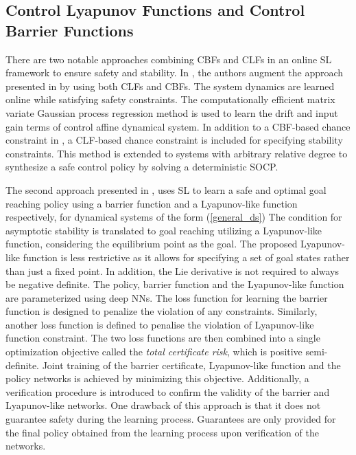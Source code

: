 \documentclass[3p,times,procedia]{elsarticle}
\begin{document}
\subsection{Control Lyapunov Functions and Control Barrier Functions}\label{sec:online-clf-cbf}
There are two notable approaches combining CBFs and CLFs in an online SL framework to ensure safety and stability. In \cite{Dhiman2020}, the authors augment the approach presented in \cite{Khojasteh2019} by using both CLFs and CBFs. The system dynamics are learned online while satisfying safety constraints. The computationally efficient matrix variate Gaussian process regression method is used to learn the drift and input gain terms of control affine dynamical system. In addition to a CBF-based chance constraint in \cite{Khojasteh2019}, a CLF-based chance constraint is included for specifying stability constraints. This method is extended to systems with arbitrary relative degree to synthesize a safe control policy by solving a deterministic SOCP.

The second approach presented in \cite{Jin2020}, uses SL to learn a safe and optimal goal reaching policy using a barrier function and a Lyapunov-like function respectively, for dynamical systems of the form (\ref{general_ds}) The condition for asymptotic stability is translated to goal reaching utilizing a Lyapunov-like function, considering the equilibrium point as the goal. The proposed Lyapunov-like function is less restrictive as it allows for specifying a set of goal states rather than just a fixed point. In addition, the Lie derivative is not required to always be negative definite. The policy, barrier function and the Lyapunov-like function are parameterized using deep NNs. The loss function for learning the barrier function is designed to penalize the violation of any constraints. Similarly, another loss function is defined to penalise the violation of Lyapunov-like function constraint. The two loss functions are then combined into a single optimization objective called the \textit{total certificate risk}, which is positive semi-definite. Joint training of the barrier certificate, Lyapunov-like function and the policy networks is achieved by minimizing this objective. Additionally, a verification procedure is introduced to confirm the validity of the barrier and Lyapunov-like networks. One drawback of this approach is that it does not guarantee safety during the learning process. Guarantees are only provided for the final policy obtained from the learning process upon verification of the networks. 
\end{document}
